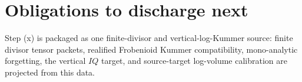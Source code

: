 \section{Obligations to discharge next}

\begin{definition}
  \label{def:step-x-logkummer-package}
  \leanok
  Step (x) is packaged as one finite-divisor and vertical-log-Kummer source:
  finite divisor tensor packets, realified Frobenioid Kummer compatibility,
  mono-analytic forgetting, the vertical \(IQ\) target, and source-target
  log-volume calibration are projected from this data.
\end{definition}

